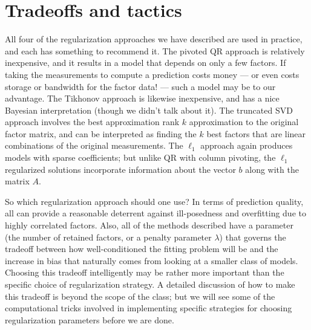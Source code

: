 \documentclass[12pt, leqno]{article}
\begin{document}
\section{Tradeoffs and tactics}

All four of the regularization approaches we have described are used
in practice, and each has something to recommend it.  The pivoted QR
approach is relatively inexpensive, and it results in a model that
depends on only a few factors.  If taking the measurements to compute
a prediction costs money --- or even costs storage or bandwidth for
the factor data! --- such a model may be to our advantage.  The
Tikhonov approach is likewise inexpensive, and has a nice Bayesian
interpretation (though we didn't talk about it).  The truncated SVD
approach involves the best approximation rank $k$ approximation to the
original factor matrix, and can be interpreted as finding the $k$ best
factors that are linear combinations of the original measurements.
The $\ell_1$ approach again produces models with sparse coefficients;
but unlike QR with column pivoting, the $\ell_1$ regularized solutions
incorporate information about the vector $b$ along with the matrix $A$.

So which regularization approach should one use?  In terms of
prediction quality, all can provide a reasonable deterrent against
ill-posedness and overfitting due to highly correlated factors.  Also,
all of the methods described have a parameter (the number of retained
factors, or a penalty parameter $\lambda$) that governs the tradeoff
between how well-conditioned the fitting problem will be and the
increase in bias that naturally comes from looking at a smaller class
of models.  Choosing this tradeoff intelligently may be rather more
important than the specific choice of regularization strategy.  A
detailed discussion of how to make this tradeoff is beyond the scope
of the class; but we will see some of the computational tricks
involved in implementing specific strategies for choosing
regularization parameters before we are done.
\end{document}
